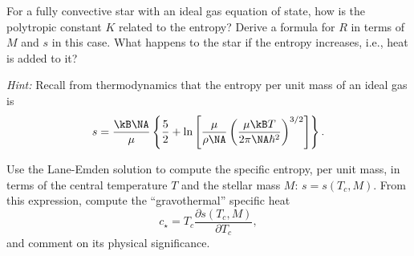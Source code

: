\begin{exercisebox}
\label{p.radius-entropy} For a fully convective star with an ideal gas equation of state, how is the polytropic constant $K$ related to the entropy? Derive a formula for $R$ in terms of $M$ and $s$ in this case.  What happens to the star if the entropy increases, i.e., heat is added to it?

\emph{Hint:} Recall from thermodynamics that the entropy per unit mass of an ideal gas is
\begin{equation}\label{e.exercise-entropy}
s = \frac{\kB \NA}{\mu}\left\{ \frac{5}{2} + \ln\left[\frac{\mu}{\rho\NA}\left(\frac{\mu\kB T}{2\pi\NA\hbar^{2}}\right)^{3/2}\right]\right\}.
\end{equation}

Use the Lane-Emden solution to compute the specific entropy, per unit mass, in terms of the central temperature $T$ and the stellar mass $M$: $s = s(T_{c},M)$.  From this expression,  compute the ``gravothermal'' specific heat
\begin{equation}\label{e.cstar}
c_{\star} = T_{c}\frac{\partial s(T_{c},M)}{\partial T_{c}},
\end{equation}
and comment on its physical significance.
\end{exercisebox}

